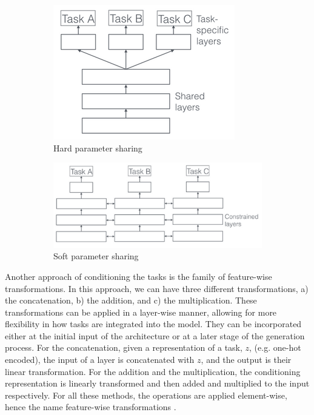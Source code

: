 \documentclass[12pt, a4paper]{article}
\begin{document}
\begin{figure}[h!]
    \centering
    \begin{subfigure}[t]{0.48\textwidth}
        \centering
        \includegraphics[width=.6\textwidth]{hard.png}
        \caption{Hard parameter sharing}
        \label{fig:hard}
    \end{subfigure}
    \hfill
    \begin{subfigure}[t]{0.48\textwidth}
        \centering
        \includegraphics[width=\textwidth]{soft.png}
        \caption{Soft parameter sharing}
        \label{fig:soft}
    \end{subfigure}
    \caption{\cite{ruderOverviewMultiTaskLearning2017}}
    \label{}
\end{figure}

Another approach of conditioning the tasks is the family of feature-wise transformations. In this approach, we can have three different transformations, a) the concatenation, b) the addition, and c) the multiplication. These transformations can be applied in a layer-wise manner, allowing for more flexibility in how tasks are integrated into the model. They can be incorporated either at the initial input of the architecture or at a later stage of the generation process. For the concatenation, given a representation of a task, $z$, (e.g. one-hot encoded), the input of a layer is concatenated with $z$, and the output is their linear transformation. For the addition and the multiplication, the conditioning representation is linearly transformed and then added and multiplied to the input respectively. For all these methods, the operations are applied element-wise, hence the name feature-wise transformations \cite{dumoulin2018feature-wise}.
\end{document}
